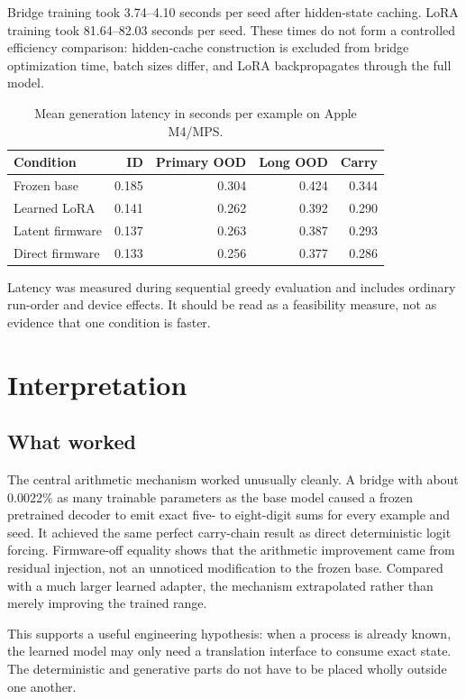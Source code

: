 \documentclass[11pt]{article}
\begin{document}
Bridge training took 3.74--4.10 seconds per seed after hidden-state caching.
LoRA training took 81.64--82.03 seconds per seed. These times do not form a
controlled efficiency comparison: hidden-cache construction is excluded from
bridge optimization time, batch sizes differ, and LoRA backpropagates through
the full model.

\begin{table}[ht]
\centering
\small
\caption{Mean generation latency in seconds per example on Apple M4/MPS.}
\begin{tabular}{lrrrr}
\toprule
Condition & ID & Primary OOD & Long OOD & Carry\\
\midrule
Frozen base & 0.185 & 0.304 & 0.424 & 0.344\\
Learned LoRA & 0.141 & 0.262 & 0.392 & 0.290\\
Latent firmware & 0.137 & 0.263 & 0.387 & 0.293\\
Direct firmware & 0.133 & 0.256 & 0.377 & 0.286\\
\bottomrule
\end{tabular}
\end{table}

Latency was measured during sequential greedy evaluation and includes ordinary
run-order and device effects. It should be read as a feasibility measure, not
as evidence that one condition is faster.

\section{Interpretation}

\subsection{What worked}

The central arithmetic mechanism worked unusually cleanly. A bridge with about
0.0022\% as many trainable parameters as the base model caused a frozen
pretrained decoder to emit exact five- to eight-digit sums for every example
and seed. It achieved the same perfect carry-chain result as direct deterministic
logit forcing. Firmware-off equality shows that the arithmetic improvement came
from residual injection, not an unnoticed modification to the frozen base.
Compared with a much larger learned adapter, the mechanism extrapolated rather
than merely improving the trained range.

This supports a useful engineering hypothesis: when a process is already
known, the learned model may only need a translation interface to consume exact
state. The deterministic and generative parts do not have to be placed wholly
outside one another.
\end{document}
